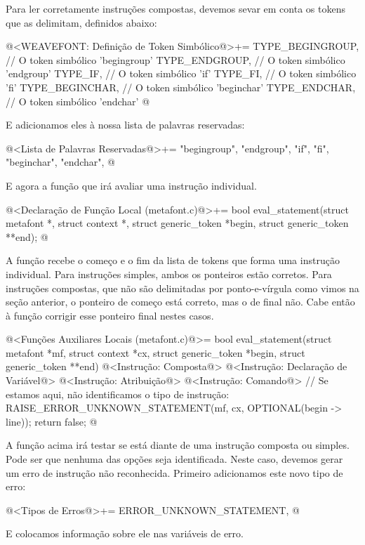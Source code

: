 Para ler corretamente instruções compostas, devemos sevar em conta os
tokens que as delimitam, definidos abaixo:

\iniciocodigo
@<WEAVEFONT: Definição de Token Simbólico@>+=
TYPE_BEGINGROUP,            // O token simbólico 'begingroup'
TYPE_ENDGROUP,              // O token simbólico 'endgroup'
TYPE_IF,                    // O token simbólico 'if'
TYPE_FI,                    // O token simbólico 'fi'
TYPE_BEGINCHAR,             // O token simbólico 'beginchar'
TYPE_ENDCHAR,               // O token simbólico 'endchar'
@
\fimcodigo

E adicionamos eles à nossa lista de palavras reservadas:

\iniciocodigo
@<Lista de Palavras Reservadas@>+=
"begingroup", "endgroup", "if", "fi", "beginchar", "endchar",
@
\fimcodigo

E agora a função que irá avaliar uma instrução individual.

\iniciocodigo
@<Declaração de Função Local (metafont.c)@>+=
bool eval_statement(struct metafont *, struct context *,
                    struct generic_token *begin, struct generic_token **end);
@
\fimcodigo

A função recebe o começo e o fim da lista de tokens que forma uma
instrução individual. Para instruções simples, ambos os ponteiros
estão corretos. Para instruções compostas, que não são delimitadas por
ponto-e-vírgula como vimos na seção anterior, o ponteiro de começo
está correto, mas o de final não. Cabe então à
função  corrigir esse ponteiro final
nestes casos.

\iniciocodigo
@<Funções Auxiliares Locais (metafont.c)@>=
bool eval_statement(struct metafont *mf, struct context *cx,
                    struct generic_token *begin, struct generic_token **end){
  @<Instrução: Composta@>
  @<Instrução: Declaração de Variável@>
  @<Instrução: Atribuição@>
  @<Instrução: Comando@>
  // Se estamos aqui, não identificamos o tipo de instrução:
  RAISE_ERROR_UNKNOWN_STATEMENT(mf, cx, OPTIONAL(begin -> line));
  return false;
}
@
\fimcodigo

A função acima irá testar se está diante de uma instrução composta ou
simples. Pode ser que nenhuma das opções seja identificada. Neste
caso, devemos gerar um erro de instrução não reconhecida. Primeiro
adicionamos este novo tipo de erro:

\iniciocodigo
@<Tipos de Erros@>+=
ERROR_UNKNOWN_STATEMENT,
@
\fimcodigo

E colocamos informação sobre ele nas variáveis de erro.

